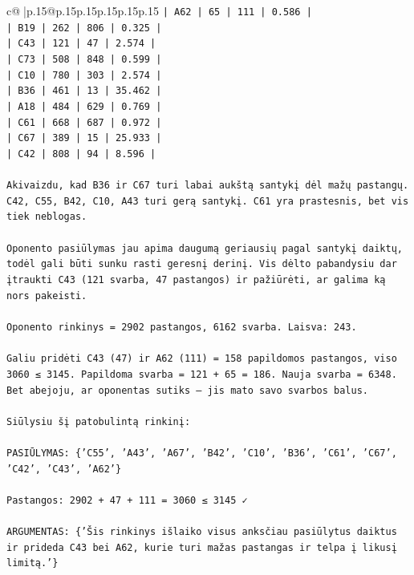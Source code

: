 \documentclass{article}
\begin{document}
{\begin{supertabular}{c@{$\;$}|p{.15\linewidth}@{}p{.15\linewidth}p{.15\linewidth}p{.15\linewidth}p{.15\linewidth}p{.15\linewidth}}
{{{\texttt{| A62 | 65 | 111 | 0.586 |} \\
\texttt{| B19 | 262 | 806 | 0.325 |} \\
\texttt{| C43 | 121 | 47 | 2.574 |} \\
\texttt{| C73 | 508 | 848 | 0.599 |} \\
\texttt{| C10 | 780 | 303 | 2.574 |} \\
\texttt{| B36 | 461 | 13 | 35.462 |} \\
\texttt{| A18 | 484 | 629 | 0.769 |} \\
\texttt{| C61 | 668 | 687 | 0.972 |} \\
\texttt{| C67 | 389 | 15 | 25.933 |} \\
\texttt{| C42 | 808 | 94 | 8.596 |} \\
\\ 
\texttt{Akivaizdu, kad B36 ir C67 turi labai aukštą santykį dėl mažų pastangų. C42, C55, B42, C10, A43 turi gerą santykį. C61 yra prastesnis, bet vis tiek neblogas.} \\
\\ 
\texttt{Oponento pasiūlymas jau apima daugumą geriausių pagal santykį daiktų, todėl gali būti sunku rasti geresnį derinį. Vis dėlto pabandysiu dar įtraukti C43 (121 svarba, 47 pastangos) ir pažiūrėti, ar galima ką nors pakeisti.} \\
\\ 
\texttt{Oponento rinkinys = 2902 pastangos, 6162 svarba. Laisva: 243.} \\
\\ 
\texttt{Galiu pridėti C43 (47) ir A62 (111) = 158 papildomos pastangos, viso 3060 ≤ 3145. Papildoma svarba = 121 + 65 = 186. Nauja svarba = 6348. Bet abejoju, ar oponentas sutiks – jis mato savo svarbos balus.} \\
\\ 
\texttt{Siūlysiu šį patobulintą rinkinį:} \\
\\ 
\texttt{PASIŪLYMAS: \{'C55', 'A43', 'A67', 'B42', 'C10', 'B36', 'C61', 'C67', 'C42', 'C43', 'A62'\}} \\
\\ 
\texttt{Pastangos: 2902 + 47 + 111 = 3060 ≤ 3145 ✓} \\
\\ 
\texttt{ARGUMENTAS: \{'Šis rinkinys išlaiko visus anksčiau pasiūlytus daiktus ir prideda C43 bei A62, kurie turi mažas pastangas ir telpa į likusį limitą.'\}} \\
            }
        }
    }
     \\ \\


\end{supertabular}}
\end{document}

